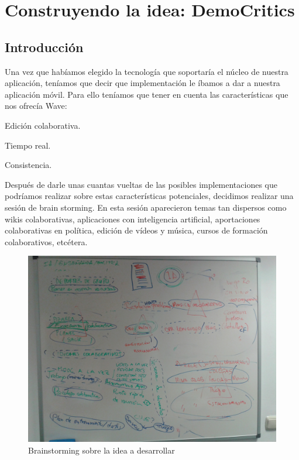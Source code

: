 \newpage
\thispagestyle{sectioned}
\chapter{Construyendo la idea: DemoCritics}

\section{Introducción}
Una vez que habíamos elegido la tecnología que soportaría el núcleo de nuestra aplicación, teníamos que decir que implementación le íbamos a dar a nuestra aplicación móvil. Para ello teníamos que tener en cuenta las características que nos ofrecía Wave:

Edición colaborativa.

Tiempo real.

Consistencia.

Después de darle unas cuantas vueltas de las posibles implementaciones que podríamos realizar sobre estas características potenciales, decidimos realizar una sesión de brain storming. En esta sesión aparecieron temas tan dispersos como wikis colaborativas, aplicaciones con inteligencia artificial, aportaciones colaborativas en política, edición de vídeos y música, cursos de formación colaborativos, etcétera.

\begin{figure}[H]
\centering
\includegraphics[keepaspectratio, scale=0.15]{Media/Captures/brainstorming.jpg}
\caption{Brainstorming sobre la idea a desarrollar}
\label{fig:brainstorming}
\end{figure}

